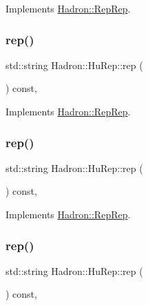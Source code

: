 Implements \mbox{\hyperlink{structHadron_1_1RepRep_ab3213025f6de249f7095892109575fde}{Hadron\+::\+Rep\+Rep}}.

\mbox{\label{structHadron_1_1HuRep_a4c8b93e1cd7db1a4bacd489f7bb90dbd}} 
\subsubsection{\texorpdfstring{rep()}{rep()}\hspace{0.1cm}{\footnotesize\ttfamily [3/5]}}
{\footnotesize\ttfamily std\+::string Hadron\+::\+Hu\+Rep\+::rep (\begin{DoxyParamCaption}{ }\end{DoxyParamCaption}) const\hspace{0.3cm}{\ttfamily [inline]}, {\ttfamily [virtual]}}



Implements \mbox{\hyperlink{structHadron_1_1RepRep_ab3213025f6de249f7095892109575fde}{Hadron\+::\+Rep\+Rep}}.

\mbox{\label{structHadron_1_1HuRep_a4c8b93e1cd7db1a4bacd489f7bb90dbd}} 
\subsubsection{\texorpdfstring{rep()}{rep()}\hspace{0.1cm}{\footnotesize\ttfamily [4/5]}}
{\footnotesize\ttfamily std\+::string Hadron\+::\+Hu\+Rep\+::rep (\begin{DoxyParamCaption}{ }\end{DoxyParamCaption}) const\hspace{0.3cm}{\ttfamily [inline]}, {\ttfamily [virtual]}}



Implements \mbox{\hyperlink{structHadron_1_1RepRep_ab3213025f6de249f7095892109575fde}{Hadron\+::\+Rep\+Rep}}.

\mbox{\label{structHadron_1_1HuRep_a4c8b93e1cd7db1a4bacd489f7bb90dbd}} 
\subsubsection{\texorpdfstring{rep()}{rep()}\hspace{0.1cm}{\footnotesize\ttfamily [5/5]}}
{\footnotesize\ttfamily std\+::string Hadron\+::\+Hu\+Rep\+::rep (\begin{DoxyParamCaption}{ }\end{DoxyParamCaption}) const\hspace{0.3cm}{\ttfamily [inline]}, {\ttfamily [virtual]}}



